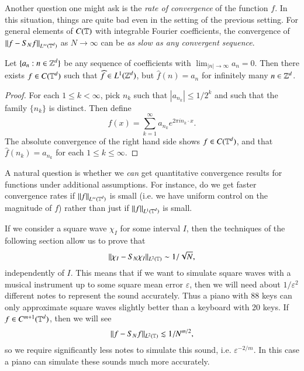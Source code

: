 Another question one might ask is the \emph{rate of convergence} of the function $f$. In this situation, things are quite bad even in the setting of the previous setting. For general elements of $C(\operatorname{\mathbb{T}})$ with integrable Fourier coefficients, the convergence of $\| f - S_N f \|_{L^\infty(\operatorname{\mathbb{T}}^d)}$ as $N \to \infty$ can be \emph{as slow as any convergent sequence}.

\begin{theorem}
    Let $\{ a_n : n \in \operatorname{\mathbb{Z}}^d \}$ be any sequence of coefficients with $\lim_{|n| \to \infty} a_n = 0$. Then there exists $f \in C(\operatorname{\mathbb{T}}^d)$ such that $\widehat{f} \in L^1(\operatorname{\mathbb{Z}}^d)$, but $\widehat{f}(n) = a_n$ for infinitely many $n \in \operatorname{\mathbb{Z}}^d$.
\end{theorem}
\begin{proof}
    For each $1 \leq k < \infty$, pick $n_k$ such that $|a_{n_k}| \leq 1/2^k$ and such that the family $\{ n_k \}$ is distinct. Then define
    \[ f(x) = \sum_{k = 1}^\infty a_{n_k} e^{2 \pi i n_k \cdot x}. \]
    The absolute convergence of the right hand side shows $f \in C(\operatorname{\mathbb{T}}^d)$, and that $\widehat{f}(n_k) = a_{n_k}$ for each $1 \leq k \leq \infty$.
\end{proof}

A natural question is whether we \emph{can} get quantitative convergence results for functions under additional assumptions. For instance, do we get faster convergence rates if $\| f \|_{L^\infty(\operatorname{\mathbb{T}}^d)}$ is small (i.e. we have uniform control on the magnitude of $f$) rather than just if $\| f \|_{L^1(\operatorname{\mathbb{T}}^d)}$ is small.

\begin{example}
    If we consider a square wave $\chi_I$ for some interval $I$, then the techniques of the following section allow us to prove that
    \[ \| \chi_I - S_N \chi_I \|_{L^2(\operatorname{\mathbb{T}})} \sim 1/\sqrt{N}, \]
    independently of $I$. This means that if we want to simulate square waves with a musical instrument up to some square mean error $\varepsilon$, then we will need about $1/\varepsilon^2$ different notes to represent the sound accurately. Thus a piano with 88 keys can only approximate square waves slightly better than a keyboard with 20 keys. If $f \in C^{m+1}(\operatorname{\mathbb{T}}^d)$, then we will see
    \[ \| f - S_N f \|_{L^2(\operatorname{\mathbb{T}})} \lesssim 1/N^{m/2}, \]
    so we require significantly less notes to simulate this sound, i.e. $\varepsilon^{-2/m}$. In this case a piano can simulate these sounds much more accurately.
\end{example}


